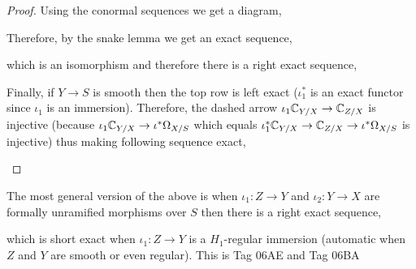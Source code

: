 \documentclass[12pt]{article}
\begin{document}
\begin{proof}
Using the conormal sequences we get a diagram,
\begin{center}
\end{center}
Therefore, by the snake lemma we get an exact sequence,
\begin{center}
\end{center}
which is an isomorphism and therefore there is a right exact sequence,
\begin{center}
\end{center}
Finally, if $Y \to S$ is smooth then the top row is left exact ($\iota_1^*$ is an exact functor since $\iota_1$ is an immersion). Therefore, the dashed arrow $\iota_1 \mathbb{C}_{Y/X} \to \mathbb{C}_{Z/X}$ is injective (because $\iota_1 \mathbb{C}_{Y/X} \to \iota^* \Omega_{X/S}$ which equals $\iota_1^* \mathbb{C}_{Y/X} \to \mathbb{C}_{Z/X} \to \iota^* \Omega_{X/S}$ is injective) thus making following sequence exact,
\begin{center}
\end{center}
\end{proof}

\begin{rmk}
The most general version of the above is when $\iota_1 : Z \to Y$ and $\iota_2 : Y \to X$ are formally unramified morphisms over $S$ then there is a right exact sequence,
\begin{center}
\end{center}
which is short exact when $\iota_1 : Z \to Y$ is a $H_1$-regular immersion (automatic when $Z$ and $Y$ are smooth or even regular). This is Tag 06AE and Tag 06BA 
\end{rmk}
\end{document}
